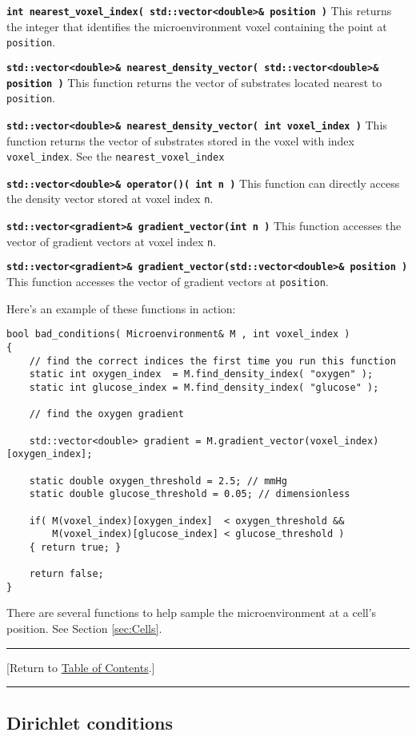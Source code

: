 \documentclass[12pt]{article}
\newcommand{\smallcode}[1]{\textbf{\texttt{#1}}}
\newcommand{\TOClink}{\begin{center}\hrule\vskip-10pt\phantom{.}\hfill[Return to \hyperlink{TOC}{Table of Contents}.]\hfill\phantom{.}\vskip3pt\hrule\end{center}}
\begin{document}
\smallcode{int nearest\_voxel\_index( std::vector<double>\& position )} This 
returns the integer that identifies the microenvironment voxel containing the 
point at \verb+position+. 

\smallcode{std::vector<double>\& nearest\_density\_vector( std::vector<double>\& position )} 
This function returns the vector of substrates located nearest to \verb+position+. 

\smallcode{std::vector<double>\& nearest\_density\_vector( int voxel\_index )} 
This function returns the vector of substrates stored in the voxel with index 
\verb+voxel_index+. See the \verb+nearest_voxel_index+ 

\smallcode{std::vector<double>\& operator()( int n )} This function 
can directly access the density vector stored at voxel index \verb+n+. 

\smallcode{std::vector<gradient>\& gradient\_vector(int n )} This function 
accesses the vector of gradient vectors at voxel index \verb+n+. 
	
\smallcode{std::vector<gradient>\& gradient\_vector(std::vector<double>\& position )}
This function accesses the vector of gradient vectors at \verb+position+.

Here's an example of these functions in action:

\begin{verbatim}
bool bad_conditions( Microenvironment& M , int voxel_index )
{
    // find the correct indices the first time you run this function
    static int oxygen_index  = M.find_density_index( "oxygen" ); 
    static int glucose_index = M.find_density_index( "glucose" ); 

    // find the oxygen gradient 
    
    std::vector<double> gradient = M.gradient_vector(voxel_index)[oxygen_index]; 

    static double oxygen_threshold = 2.5; // mmHg 
    static double glucose_threshold = 0.05; // dimensionless 
 
    if( M(voxel_index)[oxygen_index]  < oxygen_threshold && 
        M(voxel_index)[glucose_index] < glucose_threshold )
    { return true; }
    
    return false; 
}
\end{verbatim}

There are several functions to help sample the microenvironment  
at a cell's position. See Section \ref{sec:Cells}.


\TOClink 

\subsection{Dirichlet conditions}
\label{sec:Dirichlet}
\end{document}
